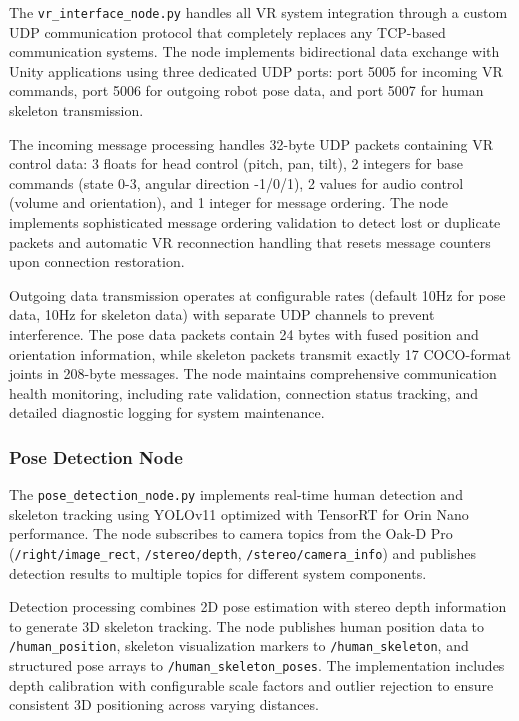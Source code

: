 The \texttt{vr\_interface\_node.py} handles all VR system integration through a custom UDP communication protocol that completely replaces any TCP-based communication systems. The node implements bidirectional data exchange with Unity applications using three dedicated UDP ports: port 5005 for incoming VR commands, port 5006 for outgoing robot pose data, and port 5007 for human skeleton transmission.

The incoming message processing handles 32-byte UDP packets containing VR control data: 3 floats for head control (pitch, pan, tilt), 2 integers for base commands (state 0-3, angular direction -1/0/1), 2 values for audio control (volume and orientation), and 1 integer for message ordering. The node implements sophisticated message ordering validation to detect lost or duplicate packets and automatic VR reconnection handling that resets message counters upon connection restoration.

Outgoing data transmission operates at configurable rates (default 10Hz for pose data, 10Hz for skeleton data) with separate UDP channels to prevent interference. The pose data packets contain 24 bytes with fused position and orientation information, while skeleton packets transmit exactly 17 COCO-format joints in 208-byte messages. The node maintains comprehensive communication health monitoring, including rate validation, connection status tracking, and detailed diagnostic logging for system maintenance.

\subsubsection{Pose Detection Node}

The \texttt{pose\_detection\_node.py} implements real-time human detection and skeleton tracking using YOLOv11 optimized with TensorRT for Orin Nano performance. The node subscribes to camera topics from the Oak-D Pro (\texttt{/right/image\_rect}, \texttt{/stereo/depth}, \texttt{/stereo/camera\_info}) and publishes detection results to multiple topics for different system components.

Detection processing combines 2D pose estimation with stereo depth information to generate 3D skeleton tracking. The node publishes human position data to \texttt{/human\_position}, skeleton visualization markers to \texttt{/human\_skeleton}, and structured pose arrays to \texttt{/human\_skeleton\_poses}. The implementation includes depth calibration with configurable scale factors and outlier rejection to ensure consistent 3D positioning across varying distances.

